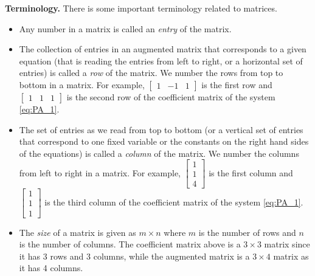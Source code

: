 \noindent \textbf{Terminology.} There is some important terminology related to matrices.
	\begin{itemize}
	\item Any number in a matrix is called an \emph{entry} of the matrix. 
	\item The collection of entries in an augmented matrix that corresponds to a given equation (that is reading the entries from left to right, or a horizontal set of entries) is called a \emph{row} of the matrix. We number the rows from top to bottom in a matrix. For example, $\left[ \begin{array}{crc} 1&-1&1 \end{array} \right]$ is the first row and $\left[ \begin{array}{ccc} 1&1&1 \end{array} \right]$ is the second row of the coefficient matrix of the system \eqref{eq:PA_1}.
	\item The set of entries as we read from top to bottom (or a vertical set of entries that correspond to one fixed variable or the constants on the right hand sides of the equations) is called a \emph{column} of the matrix. We number the columns from left to right in a matrix.  For example, $\left[ \begin{array}{c} 1 \\ 1 \\ 4 \end{array} \right]$ is the first column and $\left[ \begin{array}{c} 1 \\ 1 \\ 1 \end{array} \right]$  is the third column of the coefficient matrix of the system \eqref{eq:PA_1}.
	\item The \emph{size} of a matrix is given as $m\times n$ where $m$ is the number of rows and $n$ is the number of columns. The coefficient matrix above is a $3\times 3$ matrix since it has 3 rows and 3 columns, while the augmented matrix is a $3\times 4$ matrix as it has 4 columns.
	\end{itemize}


